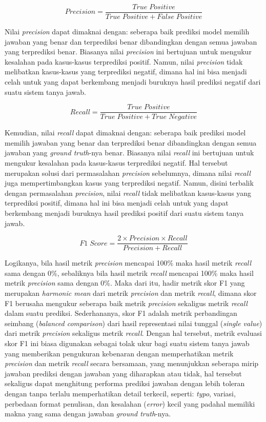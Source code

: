 \begin{equation}
Precision = \frac{True \; Positive}{True \; Positive + False \; Positive}
\end{equation}

Nilai \emph{precision} dapat dimaknai dengan: seberapa baik prediksi model memilih jawaban yang benar dan terprediksi benar dibandingkan dengan semua jawaban yang terprediksi benar. Biasanya nilai \emph{precision} ini bertujuan untuk mengukur kesalahan pada kasus-kasus terprediksi positif. Namun, nilai \emph{precision} tidak melibatkan kasus-kasus yang terprediksi negatif, dimana hal ini bisa menjadi celah untuk yang dapat berkembang menjadi buruknya hasil prediksi negatif dari suatu sistem tanya jawab.

\begin{equation}
Recall = \frac{True \; Positive}{True \; Positive + True \; Negative}
\end{equation}

Kemudian, nilai \emph{recall} dapat dimaknai dengan: seberapa baik prediksi model memilih jawaban yang benar dan terprediksi benar dibandingkan dengan semua jawaban yang \emph{ground truth}-nya benar. Biasanya nilai \emph{recall} ini bertujuan untuk mengukur kesalahan pada kasus-kasus terprediksi negatif. Hal tersebut merupakan solusi dari permasalahan \emph{precision} sebelumnya, dimana nilai \emph{recall} juga mempertimbangkan kasus yang terprediksi negatif. Namun, disini terbalik dengan permasalahan \emph{precision}, nilai \emph{recall} tidak melibatkan kasus-kasus yang terprediksi positif, dimana hal ini bisa menjadi celah untuk yang dapat berkembang menjadi buruknya hasil prediksi positif dari suatu sistem tanya jawab.

\begin{equation}
F1 \; Score = \frac{2 \times Precision \times Recall}{Precision + Recall}
\end{equation}

Logikanya, bila hasil metrik \emph{precision} mencapai 100\% maka hasil metrik \emph{recall} sama dengan 0\%, sebaliknya bila hasil metrik \emph{recall} mencapai 100\% maka hasil metrik \emph{precision} sama dengan 0\%. Maka dari itu, hadir metrik skor F1 yang merupakan \emph{harmonic mean} dari metrik \emph{precision} dan metrik \emph{recall}, dimana skor F1 berusaha mengukur seberapa baik metrik \emph{precision} sekaligus metrik \emph{recall} dalam suatu prediksi. Sederhananya, skor F1 adalah metrik perbandingan seimbang (\emph{balanced comparison}) dari hasil representasi nilai tunggal (\emph{single value}) dari metrik \emph{precision} sekaligus metrik \emph{recall}. Dengan hal tersebut, metrik evaluasi skor F1 ini biasa digunakan sebagai tolak ukur bagi suatu sistem tanya jawab yang memberikan pengukuran kebenaran dengan memperhatikan metrik \emph{precision} dan metrik \emph{recall} secara bersamaan, yang menunjukkan seberapa mirip jawaban prediksi dengan jawaban yang diharapkan atau tidak, hal tersebut sekaligus dapat menghitung performa prediksi jawaban dengan lebih toleran dengan tanpa terlalu memperhatikan detail terkecil, seperti: \emph{typo}, variasi, perbedaan format penulisan, dan kesalahan (\emph{error}) kecil yang padahal memiliki makna yang sama dengan jawaban \emph{ground truth}-nya.